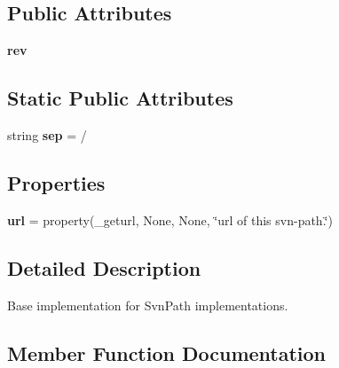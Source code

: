 \subsection*{Public Attributes}
\begin{DoxyCompactItemize}
\item 
\mbox{\label{classpy_1_1__path_1_1svnwc_1_1_svn_path_base_aaf34237664a5390404bb5bf75ea1af5c}} 
{\bfseries rev}
\end{DoxyCompactItemize}
\subsection*{Static Public Attributes}
\begin{DoxyCompactItemize}
\item 
\mbox{\label{classpy_1_1__path_1_1svnwc_1_1_svn_path_base_acfccca222261d37be2a466931772b925}} 
string {\bfseries sep} = \textquotesingle{}/\textquotesingle{}
\end{DoxyCompactItemize}
\subsection*{Properties}
\begin{DoxyCompactItemize}
\item 
\mbox{\label{classpy_1_1__path_1_1svnwc_1_1_svn_path_base_a5f46917c55225f2368d2639189b7ae6f}} 
{\bfseries url} = property(\+\_\+geturl, None, None, \char`\"{}url of this svn-\/path.\char`\"{})
\end{DoxyCompactItemize}


\subsection{Detailed Description}
\begin{DoxyVerb}Base implementation for SvnPath implementations. \end{DoxyVerb}
 

\subsection{Member Function Documentation}
\mbox{\label{classpy_1_1__path_1_1svnwc_1_1_svn_path_base_a63a5f60052e2e371106b15315df9c5ea}} 
